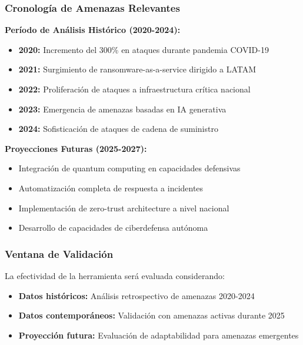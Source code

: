 \subsubsection{Cronología de Amenazas Relevantes}
\textbf{Período de Análisis Histórico (2020-2024):}
\begin{itemize}
    \item \textbf{2020:} Incremento del 300\% en ataques durante pandemia COVID-19
    \item \textbf{2021:} Surgimiento de ransomware-as-a-service dirigido a LATAM
    \item \textbf{2022:} Proliferación de ataques a infraestructura crítica nacional
    \item \textbf{2023:} Emergencia de amenazas basadas en IA generativa
    \item \textbf{2024:} Sofisticación de ataques de cadena de suministro
\end{itemize}

\textbf{Proyecciones Futuras (2025-2027):}
\begin{itemize}
    \item Integración de quantum computing en capacidades defensivas
    \item Automatización completa de respuesta a incidentes
    \item Implementación de zero-trust architecture a nivel nacional
    \item Desarrollo de capacidades de ciberdefensa autónoma
\end{itemize}

\subsubsection{Ventana de Validación}
La efectividad de la herramienta será evaluada considerando:
\begin{itemize}
    \item \textbf{Datos históricos:} Análisis retrospectivo de amenazas 2020-2024
    \item \textbf{Datos contemporáneos:} Validación con amenazas activas durante 2025
    \item \textbf{Proyección futura:} Evaluación de adaptabilidad para amenazas emergentes
\end{itemize}
